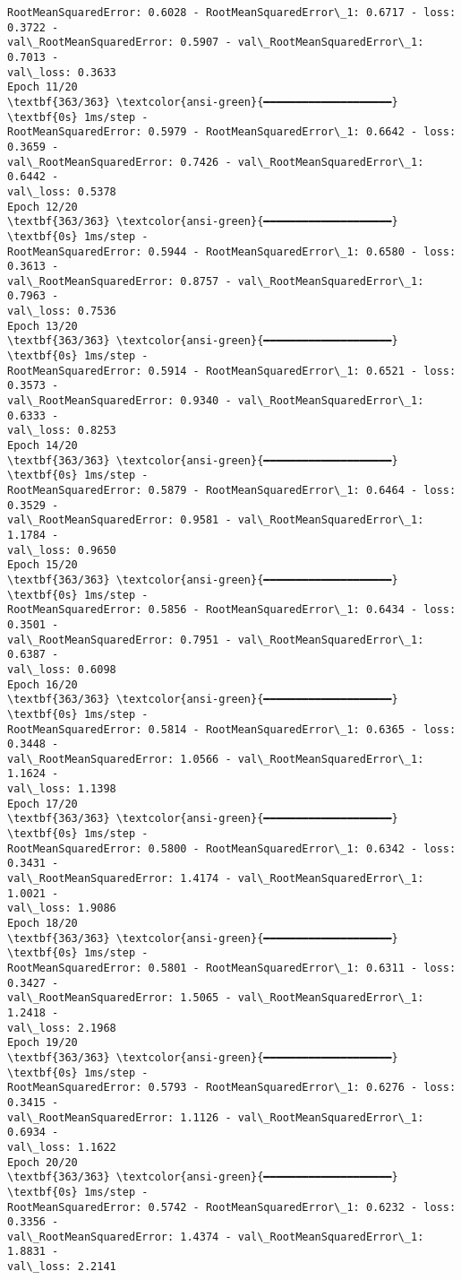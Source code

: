 \documentclass[12pt letter]{report}
\begin{document}
\begin{Verbatim}[commandchars=\\\{\}]
RootMeanSquaredError: 0.6028 - RootMeanSquaredError\_1: 0.6717 - loss: 0.3722 -
val\_RootMeanSquaredError: 0.5907 - val\_RootMeanSquaredError\_1: 0.7013 -
val\_loss: 0.3633
Epoch 11/20
\textbf{363/363} \textcolor{ansi-green}{━━━━━━━━━━━━━━━━━━━━} \textbf{0s} 1ms/step -
RootMeanSquaredError: 0.5979 - RootMeanSquaredError\_1: 0.6642 - loss: 0.3659 -
val\_RootMeanSquaredError: 0.7426 - val\_RootMeanSquaredError\_1: 0.6442 -
val\_loss: 0.5378
Epoch 12/20
\textbf{363/363} \textcolor{ansi-green}{━━━━━━━━━━━━━━━━━━━━} \textbf{0s} 1ms/step -
RootMeanSquaredError: 0.5944 - RootMeanSquaredError\_1: 0.6580 - loss: 0.3613 -
val\_RootMeanSquaredError: 0.8757 - val\_RootMeanSquaredError\_1: 0.7963 -
val\_loss: 0.7536
Epoch 13/20
\textbf{363/363} \textcolor{ansi-green}{━━━━━━━━━━━━━━━━━━━━} \textbf{0s} 1ms/step -
RootMeanSquaredError: 0.5914 - RootMeanSquaredError\_1: 0.6521 - loss: 0.3573 -
val\_RootMeanSquaredError: 0.9340 - val\_RootMeanSquaredError\_1: 0.6333 -
val\_loss: 0.8253
Epoch 14/20
\textbf{363/363} \textcolor{ansi-green}{━━━━━━━━━━━━━━━━━━━━} \textbf{0s} 1ms/step -
RootMeanSquaredError: 0.5879 - RootMeanSquaredError\_1: 0.6464 - loss: 0.3529 -
val\_RootMeanSquaredError: 0.9581 - val\_RootMeanSquaredError\_1: 1.1784 -
val\_loss: 0.9650
Epoch 15/20
\textbf{363/363} \textcolor{ansi-green}{━━━━━━━━━━━━━━━━━━━━} \textbf{0s} 1ms/step -
RootMeanSquaredError: 0.5856 - RootMeanSquaredError\_1: 0.6434 - loss: 0.3501 -
val\_RootMeanSquaredError: 0.7951 - val\_RootMeanSquaredError\_1: 0.6387 -
val\_loss: 0.6098
Epoch 16/20
\textbf{363/363} \textcolor{ansi-green}{━━━━━━━━━━━━━━━━━━━━} \textbf{0s} 1ms/step -
RootMeanSquaredError: 0.5814 - RootMeanSquaredError\_1: 0.6365 - loss: 0.3448 -
val\_RootMeanSquaredError: 1.0566 - val\_RootMeanSquaredError\_1: 1.1624 -
val\_loss: 1.1398
Epoch 17/20
\textbf{363/363} \textcolor{ansi-green}{━━━━━━━━━━━━━━━━━━━━} \textbf{0s} 1ms/step -
RootMeanSquaredError: 0.5800 - RootMeanSquaredError\_1: 0.6342 - loss: 0.3431 -
val\_RootMeanSquaredError: 1.4174 - val\_RootMeanSquaredError\_1: 1.0021 -
val\_loss: 1.9086
Epoch 18/20
\textbf{363/363} \textcolor{ansi-green}{━━━━━━━━━━━━━━━━━━━━} \textbf{0s} 1ms/step -
RootMeanSquaredError: 0.5801 - RootMeanSquaredError\_1: 0.6311 - loss: 0.3427 -
val\_RootMeanSquaredError: 1.5065 - val\_RootMeanSquaredError\_1: 1.2418 -
val\_loss: 2.1968
Epoch 19/20
\textbf{363/363} \textcolor{ansi-green}{━━━━━━━━━━━━━━━━━━━━} \textbf{0s} 1ms/step -
RootMeanSquaredError: 0.5793 - RootMeanSquaredError\_1: 0.6276 - loss: 0.3415 -
val\_RootMeanSquaredError: 1.1126 - val\_RootMeanSquaredError\_1: 0.6934 -
val\_loss: 1.1622
Epoch 20/20
\textbf{363/363} \textcolor{ansi-green}{━━━━━━━━━━━━━━━━━━━━} \textbf{0s} 1ms/step -
RootMeanSquaredError: 0.5742 - RootMeanSquaredError\_1: 0.6232 - loss: 0.3356 -
val\_RootMeanSquaredError: 1.4374 - val\_RootMeanSquaredError\_1: 1.8831 -
val\_loss: 2.2141
    \end{Verbatim}
\end{document}
